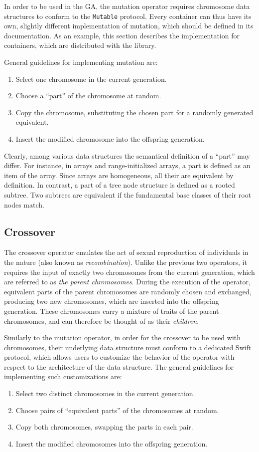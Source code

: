 In order to be used in the GA, the mutation operator requires chromosome data structures to conform to the \texttt{Mutable} protocol. Every container can thus have its own, slightly different implementation of mutation, which should be defined in its documentation. As an example, this section describes the implementation for containers, which are distributed with the library.

General guidelines for implementing mutation are:
~
\begin{enumerate}
	\item Select one chromosome in the current generation.
	\item Choose a ``part'' of the chromosome at random.
	\item Copy the chromosome, substituting the chosen part for a randomly generated equivalent.
	\item Insert the modified chromosome into the offspring generation.
\end{enumerate}

Clearly, among various data structures the semantical definition of a ``part'' may differ. For instance, in arrays and range-initialized arrays, a part is defined as an item of the array. Since arrays are homogeneous, all their are equivalent by definition. In contrast, a part of a tree node structure is defined as a rooted subtree. Two subtrees are equivalent if the fundamental base classes of their root nodes match.

\subsection{Crossover}\label{section:crossover}
The crossover operator emulates the act of sexual reproduction of individuals in the nature (also known as \textit{recombination}). Unlike the previous two operators, it requires the input of exactly two chromosomes from the current generation, which are referred to as \textit{the parent chromosomes}. During the execution of the operator, equivalent parts of the parent chromosomes are randomly chosen and exchanged, producing two new chromosomes, which are inserted into the offspring generation. These chromosomes carry a mixture of traits of the parent chromosomes, and can therefore be thought of as their \textit{children}.

Similarly to the mutation operator, in order for the crossover to be used with chromosomes, their underlying data structure must conform to a dedicated Swift protocol, which allows users to customize the behavior of the operator with respect to the architecture of the data structure. The general guidelines for implementing such customizations are:
~
\begin{enumerate}
	\item Select two distinct chromosomes in the current generation.
	\item Choose pairs of ``equivalent parts'' of the chromosomes at random.
	\item Copy both chromosomes, swapping the parts in each pair.
	\item Insert the modified chromosomes into the offspring generation.
\end{enumerate}

